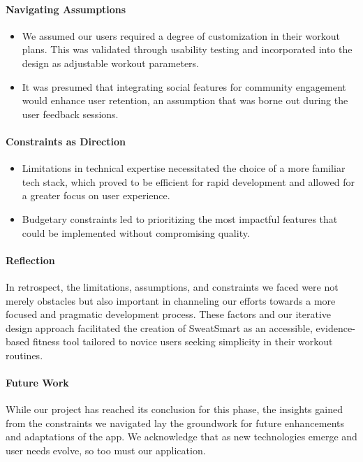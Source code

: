 \documentclass{article}
\begin{document}
\paragraph{Navigating Assumptions}
\begin{itemize}
    \item We assumed our users required a degree of customization in their workout plans. This was validated through usability testing and incorporated into the design as adjustable workout parameters.
    \item It was presumed that integrating social features for community engagement would enhance user retention, an assumption that was borne out during the user feedback sessions.
\end{itemize}

\paragraph{Constraints as Direction}
\begin{itemize}
    \item Limitations in technical expertise necessitated the choice of a more familiar tech stack, which proved to be efficient for rapid development and allowed for a greater focus on user experience.
    \item Budgetary constraints led to prioritizing the most impactful features that could be implemented without compromising quality.
\end{itemize}

\paragraph{Reflection}
In retrospect, the limitations, assumptions, and constraints we faced were not merely obstacles but also important in channeling our efforts towards a more focused and pragmatic development process. These factors and our iterative design approach facilitated the creation of SweatSmart as an accessible, evidence-based fitness tool tailored to novice users seeking simplicity in their workout routines.

\paragraph{Future Work}
While our project has reached its conclusion for this phase, the insights gained from the constraints we navigated lay the groundwork for future enhancements and adaptations of the app. We acknowledge that as new technologies emerge and user needs evolve, so too must our application.
\end{document}
